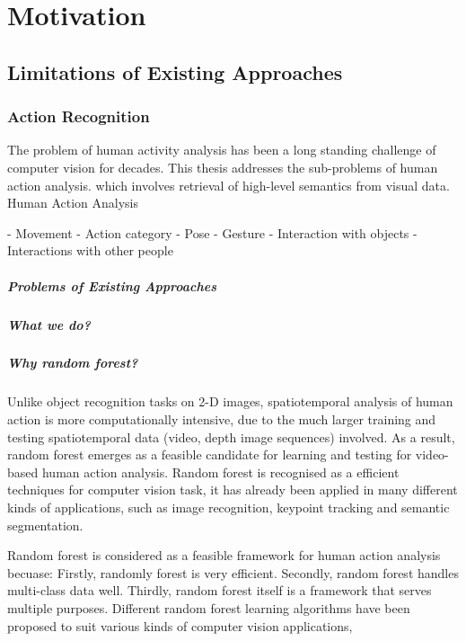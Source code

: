 \chapter{Motivation}

\section{Limitations of Existing Approaches} 

\subsection{Action Recognition}



The problem of human activity analysis has been a long standing challenge of computer vision for decades. 
This thesis addresses the sub-problems of human action analysis.  
which involves retrieval of high-level semantics from visual data. 
Human Action Analysis

- Movement
- Action category   
- Pose
- Gesture
- Interaction with objects
- Interactions with other people

\paragraph{Problems of Existing Approaches}

\paragraph{What we do?} 

\paragraph{Why random forest?} 

Unlike object recognition tasks on 2-D images, spatiotemporal analysis of human action is more computationally intensive, due to the much larger training and testing spatiotemporal data (video, depth image sequences) involved. 
As a result, random forest emerges as a feasible candidate for learning and testing for video-based human action analysis.
Random forest is recognised as a efficient techniques for computer vision task, it has already been applied in many different kinds of applications, such as image recognition, keypoint tracking and semantic segmentation. 

Random forest is considered as a feasible framework for human action analysis becuase:
Firstly, randomly forest is very efficient. 
Secondly, random forest handles multi-class data well. 
Thirdly, random forest itself is a framework that serves multiple purposes. Different random forest learning algorithms have been proposed to suit various kinds of computer vision applications, \eg  

